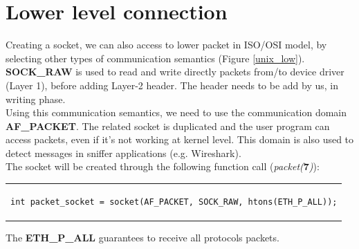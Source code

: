 \section{Lower level connection}
Creating a socket, we can also access to lower packet in ISO/OSI model, by selecting other types of communication semantics (Figure \ref{unix_low}). \textbf{SOCK\_RAW} is used to read and write directly packets from/to device driver (Layer 1), before adding Layer-2 header. The header needs to be add by us, in writing phase.\\
Using this communication semantics, we need to use the communication domain \textbf{AF\_PACKET}. The related socket is duplicated and the user program can access packets, even if it's not working at kernel level. This domain is also used to detect messages in sniffer applications (e.g. Wireshark).\\
The socket will be created through the following function call (\textit{packet(}\textbf{7}\textit{)}):
\begin{center}
\begin{tabular}{c}
\begin{lstlisting}[linewidth=340pt, basicstyle=\footnotesize\sffamily,]
int packet_socket = socket(AF_PACKET, SOCK_RAW, htons(ETH_P_ALL));
\end{lstlisting}
\end{tabular}
\end{center}
The \textbf{ETH\_P\_ALL} guarantees to receive all protocols packets.  

